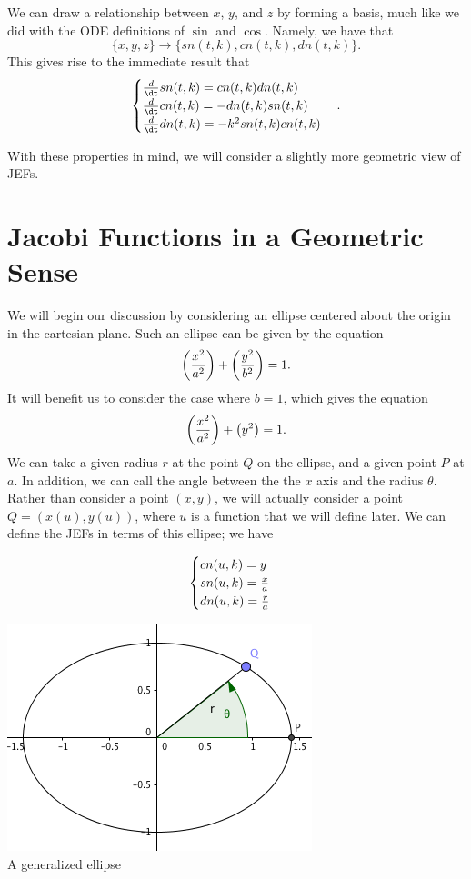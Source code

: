 \documentclass[notitlepage]{hw}
\begin{document}
We can draw a relationship between $x$, $y$, and $z$ by forming a basis, much like we did with the
ODE definitions of $\sin{}$ and $\cos{}$. Namely, we have that
\[
\{ x,y,z \}\to\{ sn(t,k),cn(t,k),dn(t,k) \}.
\]
This gives rise to the immediate result that
\[
\begin{cases}
{d\over\dt}sn(t,k)=cn(t,k)dn(t,k)\\
{d\over\dt}cn(t,k)=-dn(t,k)sn(t,k)\\
{d\over\dt}dn(t,k)=-k^{2}sn(t,k)cn(t,k)
\end{cases}.
\]

With these properties in mind, we will consider a slightly more geometric view of JEFs.

\section{Jacobi Functions in a Geometric Sense}

We will begin our discussion by considering an ellipse centered about the origin in the cartesian plane.
Such an ellipse can be given by the equation
\[
\left({x^{2}\over a^{2}}\right) + \left({y^{2}\over b^{2}}\right) = 1.
\]
It will benefit us to consider the case where $b=1$, which gives the equation
\[
\left({x^{2}\over a^{2}}\right) + \left(y^{2}\right) = 1.
\]
We can take a given radius $r$ at the point $Q$ on the ellipse, and a given point $P$ at $a$. In
addition, we can call the angle between the the $x$ axis and the radius $\theta$. Rather than consider
a point $(x,y)$, we will actually consider a point $Q=(x(u),y(u))$, where $u$ is a function that we will
define later. We can define the JEFs in terms of this ellipse; we have

\vspace{0.5cm}

\begin{minipage}{0.5\textwidth}
\[
\begin{cases}
cn(u,k)=y\\
sn(u,k)={x\over a}\\
dn(u,k)={r\over a}
\end{cases}
\]
\end{minipage}
\begin{minipage}{0.5\textwidth}
\begin{center}
\includegraphics[scale=0.5]{ellipsis}\\

A generalized ellipse
\end{center}
\end{minipage}
\end{document}
